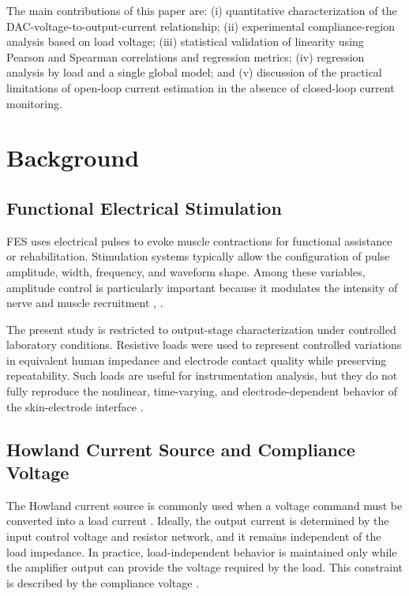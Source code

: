 \documentclass[conference]{IEEEtran}
\begin{document}
The main contributions of this paper are: (i) quantitative characterization of the DAC-voltage-to-output-current relationship; (ii) experimental compliance-region analysis based on load voltage; (iii) statistical validation of linearity using Pearson and Spearman correlations and regression metrics; (iv) regression analysis by load and a single global model; and (v) discussion of the practical limitations of open-loop current estimation in the absence of closed-loop current monitoring.

\section{Background}

\subsection{Functional Electrical Stimulation}

FES uses electrical pulses to evoke muscle contractions for functional assistance or rehabilitation. Stimulation systems typically allow the configuration of pulse amplitude, width, frequency, and waveform shape. Among these variables, amplitude control is particularly important because it modulates the intensity of nerve and muscle recruitment \cite{FES_REVIEW_1}, \cite{CURRENT_CONTROLLED_STIMULATION}.

The present study is restricted to output-stage characterization under controlled laboratory conditions. Resistive loads were used to represent controlled variations in equivalent human impedance and electrode contact quality while preserving repeatability. Such loads are useful for instrumentation analysis, but they do not fully reproduce the nonlinear, time-varying, and electrode-dependent behavior of the skin-electrode interface \cite{ELECTRODE_SKIN_IMPEDANCE}.

\subsection{Howland Current Source and Compliance Voltage}

The Howland current source is commonly used when a voltage command must be converted into a load current \cite{HOWLAND_CURRENT_SOURCE}. Ideally, the output current is determined by the input control voltage and resistor network, and it remains independent of the load impedance. In practice, load-independent behavior is maintained only while the amplifier output can provide the voltage required by the load. This constraint is described by the compliance voltage \cite{COMPLIANCE_VOLTAGE}.
\end{document}
